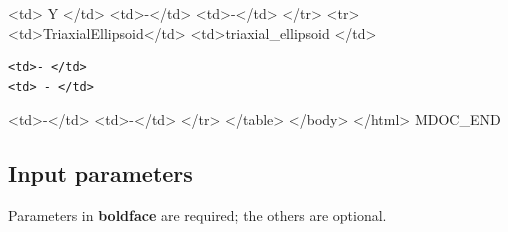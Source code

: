 \textless{}td\textgreater{} Y \textless{}/td\textgreater{} \textless{}td\textgreater{}-\textless{}/td\textgreater{} \textless{}td\textgreater{}-\textless{}/td\textgreater{} \textless{}/tr\textgreater{} \textless{}tr\textgreater{} \textless{}td\textgreater{}TriaxialEllipsoid\textless{}/td\textgreater{} \textless{}td\textgreater{}triaxial\_ellipsoid \textless{}/td\textgreater{}

\begin{verbatim}
<td>- </td>
<td> - </td>
\end{verbatim}

\textless{}td\textgreater{}-\textless{}/td\textgreater{} \textless{}td\textgreater{}-\textless{}/td\textgreater{} \textless{}/tr\textgreater{} \textless{}/table\textgreater{} \textless{}/body\textgreater{} \textless{}/html\textgreater{} MDOC\_END

\subsection*{Input parameters}
Parameters in \textbf{boldface} are required; the others are optional.

